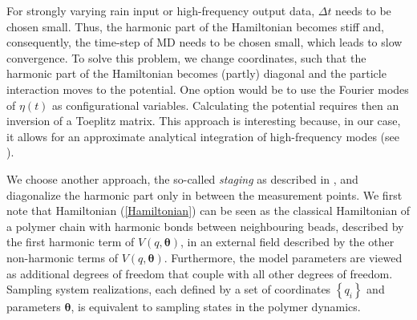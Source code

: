 \documentclass[11pt, a4paper]{article}
\newcommand{\bt}{\pmb\theta}
\begin{document}
For strongly varying rain input or high-frequency output data, $\Delta t$ needs to be chosen small. Thus, the harmonic part of the Hamiltonian becomes stiff and, consequently, the time-step of MD needs to be chosen small, which leads to slow convergence.
To solve this problem, we change coordinates, such that the harmonic part of the Hamiltonian becomes (partly) diagonal and the particle interaction moves to the potential.
One option would be to use the Fourier modes of ${\eta}(t)$ as configurational variables. Calculating the potential requires then an inversion of a Toeplitz matrix. This approach is interesting because, in our case, it allows for an approximate analytical integration of high-frequency modes (see \cite{doll_1985_fourier}).

We choose another approach, the so-called \emph{staging} as described in \cite{tuckerman1992reversible}, and diagonalize the harmonic part only in between the measurement points.
We first note that Hamiltonian (\ref{Hamiltonian}) can be seen as the classical Hamiltonian of a polymer chain with harmonic bonds between neighbouring beads, described by the first harmonic term of $V(q,\bt)$, in an external field described by the other non-harmonic terms of $V(q,\bt)$.
Furthermore, the model parameters are viewed as additional degrees of freedom that couple with all other degrees of freedom.
Sampling system realizations, each defined by a set of coordinates $\left\{ q_i\right\}$ and parameters $\bt$, is equivalent to sampling states in the polymer dynamics.
\end{document}
